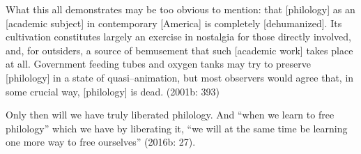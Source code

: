 \begin{myquote}
What this all demonstrates may be too obvious to mention: that [philology] as an [academic subject] in contemporary [America] is completely [dehumanized]. Its cultivation constitutes largely an exercise in nostalgia for those directly involved, and, for outsiders, a source of bemusement that such [academic work] takes place at all. Government feeding tubes and oxygen tanks may try to preserve [philology] in a state of quasi–animation, but most observers would agree that, in some crucial way, [philology] is dead. (2001b: 393)
\end{myquote}

Only then will we have truly liberated philology. And “when we learn to free philology” which we have by liberating it, “we will at the same time be learning one more way to free ourselves” (2016b: 27).

